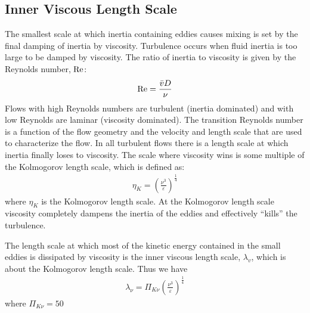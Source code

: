 \documentclass[letterpaper,10pt,english]{sphinxmanual}
\begin{document}
%
\begin{sphinxVerbatim}[commandchars=\\\{\}]
\end{sphinxVerbatim}


\subsection{Inner Viscous Length Scale}
\label{\detokenize{Rapid_Mix/RM_Derivations:inner-viscous-length-scale}}\label{\detokenize{Rapid_Mix/RM_Derivations:heading-inner-viscous-length-scale}}
The smallest scale at which inertia containing eddies causes mixing is set by the final damping of inertia by viscosity. Turbulence occurs when fluid inertia is too large to be damped by viscosity. The ratio of inertia to viscosity is given by the Reynolds number, \(\rm Re\):
\begin{equation}\label{equation:Rapid_Mix/RM_Derivations:Rapid_Mix/RM_Derivations:44}
\begin{split}{\rm{Re}} = \frac{\bar vD}{\nu}\end{split}
\end{equation}
Flows with high Reynolds numbers are turbulent (inertia dominated) and with low Reynolds are laminar (viscosity dominated). The transition Reynolds number is a function of the flow geometry and the velocity and length scale that are used to characterize the flow. In all turbulent flows there is a length scale at which inertia finally loses to viscosity. The scale where viscosity wins is some multiple of the Kolmogorov length scale, which is defined as:
\begin{equation}\label{equation:Rapid_Mix/RM_Derivations:Rapid_Mix/RM_Derivations:45}
\begin{split}\eta_K = \left( \frac{\nu^3}{\varepsilon} \right)^{\frac{1}{4}}\end{split}
\end{equation}
where \(\eta_K\) is the Kolmogorov length scale. At the Kolmogorov length scale viscosity completely dampens the inertia of the eddies and effectively “kills” the turbulence.

The length scale at which most of the kinetic energy contained in the small eddies is dissipated by viscosity is the inner viscous length scale, \(\lambda_v\), which is about  the
Kolmogorov length scale. Thus we have
\begin{equation}\label{equation:Rapid_Mix/RM_Derivations:eq_inner_viscous_length}
\begin{split}\lambda_\nu = \Pi_{K\nu}\left( \frac{\nu^3}{\varepsilon} \right)^{\frac{1}{4}}\end{split}
\end{equation}
where \(\Pi_{K\nu} = 50\)
\end{document}
